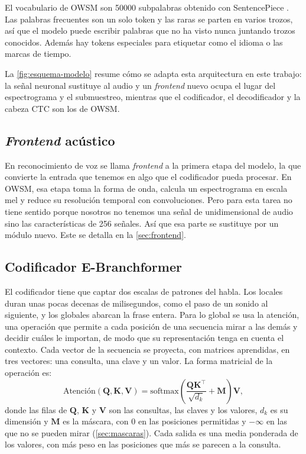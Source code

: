 El vocabulario de OWSM son 50000 subpalabras obtenido con SentencePiece \cite{kudo2018sentencepiece}. Las palabras frecuentes son un solo token y las raras se parten en varios trozos, así que el modelo puede escribir palabras que no ha visto nunca juntando trozos conocidos. Además hay tokens especiales para etiquetar como el idioma o las marcas de tiempo.

La \cref{fig:esquema-modelo} resume cómo se adapta esta arquitectura en este trabajo: la señal neuronal sustituye al audio y un \textit{frontend} nuevo ocupa el lugar del espectrograma y el submuestreo, mientras que el codificador, el decodificador y la cabeza CTC son los de OWSM.

\subsection{\textit{Frontend} acústico}

En reconocimiento de voz se llama \textit{frontend} a la primera etapa del modelo, la que convierte la entrada que tenemos en algo que el codificador pueda procesar. En OWSM, esa etapa toma la forma de onda, calcula un espectrograma en escala mel y reduce su resolución temporal con convoluciones. Pero para esta tarea no tiene sentido porque nosotros no tenemos una señal de unidimensional de audio sino las características de 256 señales. Así que esa parte se sustituye por un módulo nuevo. Este se detalla en la \cref{sec:frontend}.

\subsection{Codificador E-Branchformer}
\label{sec:ebranchformer}
\label{sec:atencion}

El codificador tiene que captar dos escalas de patrones del habla. Los locales duran unas pocas decenas de milisegundos, como el paso de un sonido al siguiente, y los globales abarcan la frase entera. Para lo global se usa la atención, una operación que permite a cada posición de una secuencia mirar a las demás y decidir cuáles le importan, de modo que su representación tenga en cuenta el contexto. Cada vector de la secuencia se proyecta, con matrices aprendidas, en tres vectores: una consulta, una clave y un valor. La forma matricial de la operación es:
\begin{equation}
  \text{Atención}(\mathbf{Q}, \mathbf{K}, \mathbf{V}) = \mathrm{softmax}\!\left( \frac{\mathbf{Q}\mathbf{K}^{\top}}{\sqrt{d_k}} + \mathbf{M} \right) \mathbf{V},
  \label{eq:atencion}
\end{equation}
donde las filas de $\mathbf{Q}$, $\mathbf{K}$ y $\mathbf{V}$ son las consultas, las claves y los valores, $d_k$ es su dimensión y $\mathbf{M}$ es la máscara, con $0$ en las posiciones permitidas y $-\infty$ en las que no se pueden mirar (\cref{sec:mascaras}). Cada salida es una media ponderada de los valores, con más peso en las posiciones que más se parecen a la consulta.

